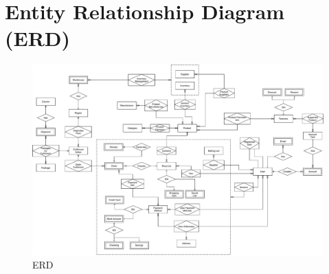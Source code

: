 \pagebreak
\section{Entity Relationship Diagram (ERD)}
\begin{figure}[h!]
\centering
\includegraphics[scale= 0.5, angle=90]{OnlineRetailDB_V2.drawio.pdf}
\caption{ERD}
% 
\end{figure}